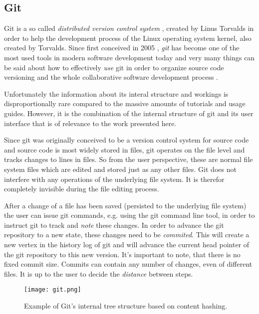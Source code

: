\subsection{Git}
\label{git}

Git is a so called \textit{distributed version control system}
\cite{git}, \cite{gitwiki} created by Linus Torvalds
\cite{gittalk} in order to help the development process of the
Linux operating system kernel, also created by Torvalds.
Since first conceived in 2005 \cite{gitbirth}, \textit{git} has become
one of the most used tools in modern software development today and
very many things can be said about how to effectively \textit{use}
git in order to organize source code versioning
and the whole collaborative software development process \cite{gitbook}.

Unfortunately the information about its interal structure and workings
is disproportionally rare compared to the massive amounts of tutorials
and usage guides. However, it is the combination of the internal
structure of git and its user interface that is of relevance to the
work presented here.
\newline

Since git was originally conceived to be a version control system
for source code and source code is most widely stored in files,
git operates on the file level and tracks changes to lines in files.
So from the user perspective, these are normal file system files
which are edited and stored just as any other files. Git does not
interfere with any operations of the underlying file system.
It is therefor completely invisible during the file editing
process.

After a change of a file has been saved (persisted to the underlying
file system) the user can issue git commands, e.g. using the
git command line tool, in order to instruct git to track and
\textit{note} these changes. In order to advance the git repository
to a new state, these changes need to be \textit{commited}. This
will create a new vertex in the history log of git and will advance
the current head pointer of the git repository to this new
version. It's important to note, that there is no fixed commit size.
Commits can contain any number of changes, even of different files.
It is up to the user to decide the \textit{distance} between
steps.

\begin{wrapfigure}{r}{0.5\textwidth}

  \texttt{[image: git.png]}
  \caption{Example of Git's internal tree structure based on content hashing.}
  \label{git}

\end{wrapfigure}


